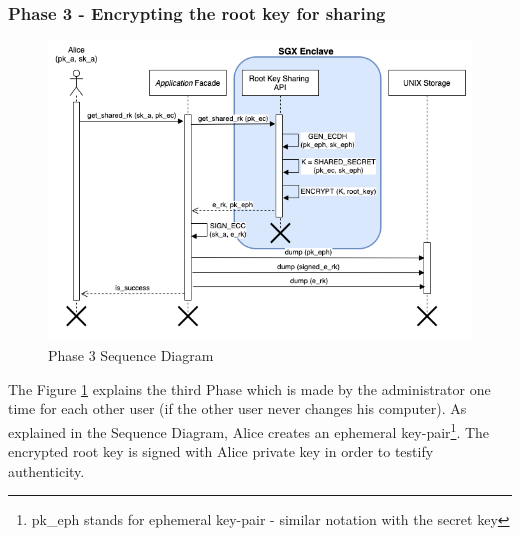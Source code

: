 \documentclass[../main.tex]{subfiles}
\begin{document}
\subsubsection{Phase 3 - Encrypting the root key for sharing}
\begin{figure}[h]
    \centering
    \includegraphics[width=\textwidth]{../../images/lauxus/upload_rk}
    
    \caption{Phase 3 Sequence Diagram}
    \label{figure:lauxus:upload_rk}
\end{figure}
\par The Figure \ref{figure:lauxus:upload_rk} explains the third Phase which is made by the administrator one time for each other user (if the other user never changes his computer). As explained in the Sequence Diagram, Alice creates an ephemeral key-pair\footnote{pk\_eph stands for ephemeral key-pair - similar notation with the secret key}. The encrypted root key is signed with Alice private key in order to testify authenticity.
\end{document}
